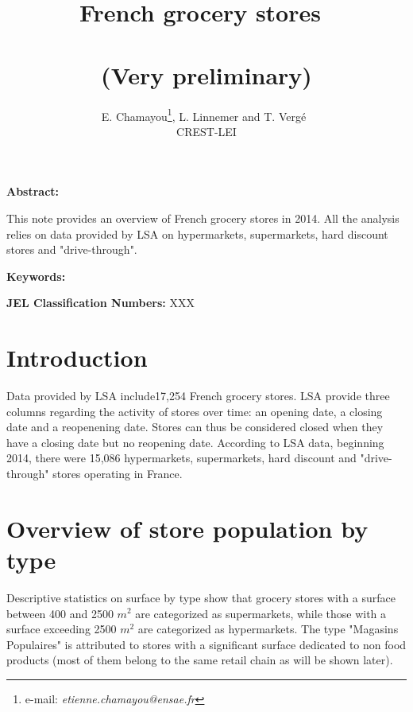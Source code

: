 \documentclass[11pt]{article}
\begin{document}
\title{French grocery stores\ \\ \ \\(Very preliminary)}
\author{E. Chamayou\thanks{e-mail:
\textit{etienne.chamayou@ensae.fr}}, L. Linnemer and T. Vergé\ \\ CREST-LEI}
\maketitle

\sloppy%

\onehalfspacing

\textbf{Abstract:}

This note provides an overview of French grocery stores in 2014. All the analysis relies on data provided by LSA on hypermarkets, supermarkets, hard discount stores and "drive-through".

\strut

\textbf{Keywords:}

\strut

\textbf{JEL Classification Numbers:} XXX

\pagebreak%
\doublespacing

\section{Introduction}

Data provided by LSA include17,254 French grocery stores. LSA provide three columns regarding the activity of stores over time: an opening date, a closing date and a reopenening date. Stores can thus be considered closed when they have a closing date but no reopening date. According to LSA data, beginning 2014, there were 15,086 hypermarkets, supermarkets, hard discount and "drive-through" stores operating in France.



\section{Overview of store population by type}


Descriptive statistics on surface by type show that grocery stores with a surface between 400 and 2500 $m^2$ are categorized as supermarkets, while those with a surface exceeding 2500 $m^2$ are categorized as hypermarkets. The type "Magasins Populaires" is attributed to stores with a significant surface dedicated to non food products (most of them belong to the same retail chain as will be shown later).
\end{document}
